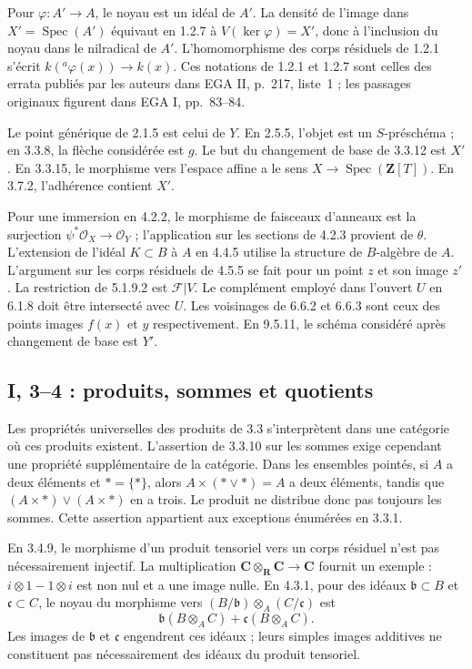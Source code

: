 \documentclass[11pt,a4paper]{article}
\begin{document}
Pour $\varphi:A'\to A$, le noyau est un idéal de $A'$.
La densité de l'image dans $X'=\operatorname{Spec}(A')$ équivaut en
1.2.7 à $V(\ker\varphi)=X'$, donc à l'inclusion du noyau dans le
nilradical de $A'$. L'homomorphisme des corps résiduels de 1.2.1
s'écrit $k({}^a\varphi(x))\to k(x)$.
Ces notations de 1.2.1 et 1.2.7 sont celles des errata publiés par
les auteurs dans EGA II, p.~217, liste~1 ; les passages originaux
figurent dans EGA I, pp.~83--84.

Le point générique de 2.1.5 est celui de $Y$.
En 2.5.5, l'objet est un $S$-préschéma ; en 3.3.8, la flèche considérée
est $g$. Le but du changement de base de 3.3.12 est $X'$.
En 3.3.15, le morphisme vers l'espace affine a le sens
$X\to\operatorname{Spec}(\mathbf Z[T])$.
En 3.7.2, l'adhérence contient $X'$.

Pour une immersion en 4.2.2, le morphisme de faisceaux d'anneaux est
la surjection $\psi^*\mathcal O_X\to\mathcal O_Y$ ; l'application sur
les sections de 4.2.3 provient de $\theta$.
L'extension de l'idéal $K\subset B$ à $A$ en 4.4.5 utilise la structure
de $B$-algèbre de $A$. L'argument sur les corps résiduels de 4.5.5
se fait pour un point $z$ et son image $z'$.
La restriction de 5.1.9.2 est $\mathcal F|V$.
Le complément employé dans l'ouvert $U$ en 6.1.8 doit être intersecté
avec $U$. Les voisinages de 6.6.2 et 6.6.3 sont ceux des points images
$f(x)$ et $y$ respectivement. En 9.5.11, le schéma considéré après
changement de base est $Y'$.

\subsection{I, 3--4 : produits, sommes et quotients}
\label{note:base1-categorical}
Les propriétés universelles des produits de 3.3 s'interprètent dans
une catégorie où ces produits existent. L'assertion de 3.3.10 sur
les sommes exige cependant une propriété supplémentaire de la
catégorie. Dans les ensembles pointés, si $A$ a deux éléments et
$*=\{*\}$, alors $A\times(*\vee*)=A$ a deux éléments, tandis que
$(A\times*)\vee(A\times*)$ en a trois. Le produit ne distribue
donc pas toujours les sommes. Cette assertion appartient aux
exceptions énumérées en 3.3.1.

En 3.4.9, le morphisme d'un produit tensoriel vers un corps résiduel
n'est pas nécessairement injectif. La multiplication
$\mathbf C\otimes_{\mathbf R}\mathbf C\to\mathbf C$ fournit
un exemple : $i\otimes1-1\otimes i$ est non nul et a une image nulle.
En 4.3.1, pour des idéaux $\mathfrak b\subset B$ et
$\mathfrak c\subset C$, le noyau du morphisme vers
$(B/\mathfrak b)\otimes_A(C/\mathfrak c)$ est
\[
 \mathfrak b(B\otimes_A C)+\mathfrak c(B\otimes_A C).
\]
Les images de $\mathfrak b$ et $\mathfrak c$ engendrent ces idéaux ;
leurs simples images additives ne constituent pas nécessairement
des idéaux du produit tensoriel.
\end{document}
